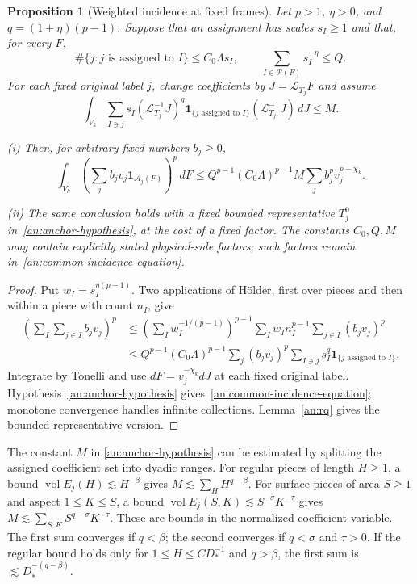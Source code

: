 \documentclass[11pt]{amsart}
\newtheorem{proposition}[theorem]{Proposition}
\theoremstyle{definition}
\theoremstyle{remark}
\numberwithin{equation}{section}
\begin{document}
\begin{proposition}[Weighted incidence at fixed frames]\label{an:common-incidence}
Let $p>1$, $\eta>0$, and $q=(1+\eta)(p-1)$. Suppose that an assignment has scales $s_I\ge1$ and that, for every $F$,
\begin{equation}\label{an:piece-hypotheses}
\#\{j:j\text{ is assigned to }I\}\le C_0\Lambda s_I,\qquad \sum_{I\in\mathscr P(F)}s_I^{-\eta}\le Q.
\end{equation}
For each fixed original label $j$, change coefficients by $J=\mathcal L_{T_j}F$ and assume
\begin{equation}\label{an:anchor-hypothesis}
\int_{V_k}\sum_{I\ni j}s_I(\mathcal L_{T_j}^{-1}J)^q\mathbf1_{\{j\text{ assigned to }I\}}(\mathcal L_{T_j}^{-1}J)\,dJ\le M.
\end{equation}

\noindent\textup{(i)} Then, for arbitrary fixed numbers $b_j\ge0$,
\begin{equation}\label{an:common-incidence-equation}
\int_{V_k}\left(\sum_j b_jv_j\mathbf1_{\mathcal A_j(F)}\right)^p\,dF\le Q^{p-1}(C_0\Lambda)^{p-1}M\sum_jb_j^pv_j^{p-\chi_k}.
\end{equation}

\noindent\textup{(ii)} The same conclusion holds with a fixed bounded representative $T_j^0$ in~\eqref{an:anchor-hypothesis}, at the cost of a fixed factor. The constants $C_0,Q,M$ may contain explicitly stated physical-side factors; such factors remain in~\eqref{an:common-incidence-equation}.
\end{proposition}
\begin{proof}
Put $w_I=s_I^{\eta(p-1)}$. Two applications of H\"older, first over pieces and then within a piece with count $n_I$, give
\[
\begin{aligned}
\left(\sum_I\sum_{j\in I}b_jv_j\right)^p&\le\left(\sum_Iw_I^{-1/(p-1)}\right)^{p-1}\sum_Iw_In_I^{p-1}\sum_{j\in I}(b_jv_j)^p\\
&\le Q^{p-1}(C_0\Lambda)^{p-1}\sum_j(b_jv_j)^p\sum_{I\ni j}s_I^q\mathbf1_{\{j\text{ assigned to }I\}}.
\end{aligned}
\]
Integrate by Tonelli and use $dF=v_j^{-\chi_k}dJ$ at each fixed original label. Hypothesis~\eqref{an:anchor-hypothesis} gives~\eqref{an:common-incidence-equation}; monotone convergence handles infinite collections. Lemma~\ref{an:rq} gives the bounded-representative version.
\end{proof}

The constant $M$ in \eqref{an:anchor-hypothesis} can be estimated by splitting the assigned coefficient set into dyadic ranges. For regular pieces of length $H\ge1$, a bound $\operatorname{vol}E_j(H)\lesssim H^{-\beta}$ gives $M\lesssim\sum_H H^{q-\beta}$. For surface pieces of area $S\ge1$ and aspect $1\le K\le S$, a bound $\operatorname{vol}E_j(S,K)\lesssim S^{-\sigma}K^{-\tau}$ gives $M\lesssim\sum_{S,K}S^{q-\sigma}K^{-\tau}$. These are bounds in the normalized coefficient variable. The first sum converges if $q<\beta$; the second converges if $q<\sigma$ and $\tau>0$. If the regular bound holds only for $1\le H\le CD_*^{-1}$ and $q>\beta$, the first sum is $\lesssim D_*^{-(q-\beta)}$.
\end{document}
